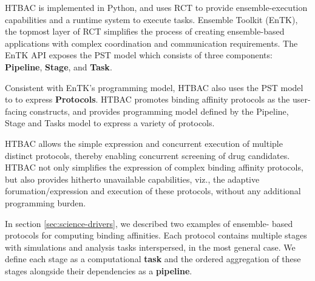 






HTBAC is implemented in Python, and uses RCT to provide ensemble-execution
capabilities and a runtime system to execute tasks. Ensemble Toolkit (EnTK),
the topmost layer of RCT simplifies the process of creating ensemble-based
applications with complex coordination and communication requirements. The
EnTK API exposes the PST model which consists of three components:
\textbf{Pipeline}, \textbf{Stage}, and \textbf{Task}. 


Consistent with EnTK's programming model, HTBAC also uses the PST model to to
express {\bf Protocols}. HTBAC promotes binding affinity protocols as the
user-facing constructs, and provides programming model defined by the
Pipeline, Stage and Tasks model to express a variety of protocols. 

HTBAC allows the simple expression and concurrent execution of multiple
distinct protocols, thereby enabling concurrent screening of drug candidates.
HTBAC not only simplifies the expression of complex binding affinity
protocols, but also provides hitherto unavailable capabilities, viz., the
adaptive forumation/expression and execution of these protocols, without any
additional programming burden.


In section \ref{sec:science-drivers}, we described two examples of ensemble-
based protocols for computing binding affinities. Each protocol contains
multiple stages with simulations and analysis tasks interspersed, in the most
general case. We define each stage as a computational \textbf{task} and the
ordered aggregation of these stages alongside their dependencies as a
\textbf{pipeline}.

